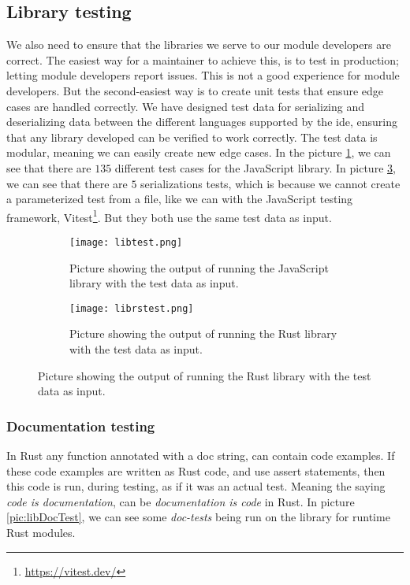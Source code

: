 \subsection{Library testing}

We also need to ensure that the libraries we serve to our module developers
are correct. The easiest way for a maintainer to achieve this, is to test in
production; letting module developers report issues. This is not a good
experience for module developers. But the second-easiest way is to create unit
tests that ensure edge cases are handled correctly. We have designed test data
for serializing and deserializing data between the different languages supported
by the \gls*{ide}, ensuring that any library developed can be verified to work
correctly. The test data is modular, meaning we can easily create new edge
cases. In the picture \ref{pic:libTest}, we can see that there are $135$
different test cases for the JavaScript library. In picture \ref{pic:libRsTest},
we can see that there are $5$ serializations tests, which is because we cannot
create a parameterized test from a file, like we can with the JavaScript testing
framework, Vitest\footnote{\url{https://vitest.dev/}}. But they both use the
same test data as input.

\begin{figure}[H]
  \begin{subfigure}[h]{0.49\linewidth}
    \centering
    \texttt{[image: libtest.png]}
    \caption{
      Picture showing the output of running the JavaScript library with the test
      data as input.
    }
    \label{pic:libTest}
  \end{subfigure}
  \hfill
  \begin{subfigure}[h]{0.49\linewidth}
    \centering
    \texttt{[image: librstest.png]}
    \caption{
      Picture showing the output of running the Rust library with the test
      data as input.
    }
    \label{pic:libRsTest}
  \end{subfigure}
\end{figure}


\subsubsection{Documentation testing}

In Rust any function annotated with a doc string, can contain code examples. If
these code examples are written as Rust code, and use assert statements, then
this code is run, during testing, as if it was an actual test. Meaning the
saying \textit{code is documentation}, can be \textit{documentation is code} in
Rust. In picture \ref{pic:libDocTest}, we can see some \textit{doc-tests} being
run on the library for runtime Rust modules.

